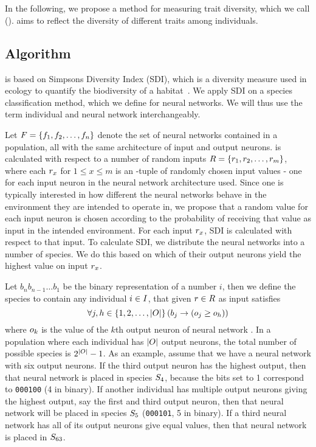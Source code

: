\section{\di{}}\label{sec:nntd}
In the following, we propose a method for measuring trait diversity, which we call \emph{\di{}} (\dia). \dia{} aims to reflect the diversity of different traits among individuals. 

\subsection{Algorithm}
\dia{} is based on Simpsons Diversity Index (SDI), which is a diversity measure used in ecology to quantify the biodiversity of a habitat~\cite{simpson1949measurement}. We apply SDI on a species classification method, which we define for neural networks. We will thus use the term individual and neural network interchangeably.

Let $F = \left\{ f_1, f_2, \dots, f_n \right\}$ denote the set of neural networks contained in a population, all with the same architecture of \nninsetl{} input and \nnoutsetl{} output neurons. \dia{} is calculated with respect to a number of random inputs $R = \left\{ r_1, r_2, \dots, r_m \right\}$, where each $r_x$ for $1 \leq x \leq m$ is an \nninsetl-tuple of randomly chosen input values - one for each input neuron in the neural network architecture used.
Since one is typically interested in how different the neural networks behave in the environment they are intended to operate in, we propose that a random value for each input neuron is chosen according to the probability of receiving that value as input in the intended environment. For each input $r_x$, SDI is calculated with respect to that input.
To calculate SDI, we distribute the neural networks into a number of species.
We do this based on which of their output neurons yield the highest value on input $r_x$. 

Let $b_{n}b_{n-1}\dots b_1$ be the binary representation of a number $i$,
then we define the species  to contain any individual $i \in I$, that given $r \in R$ as input satisfies
%
\[
  \forall j, h \in \left\{ 1, 2, \dots, \lvert O\rvert \right\} \left(b_j \rightarrow \left(o_j \geq o_h\right)\right)
\]
%
where $o_k$ is the value of the $k$th output neuron of neural network \ind.
In a population where each individual has $\lvert O\rvert$ output neurons, the total number of possible species is $2^{\lvert O\rvert} - 1$.  As an example, assume that we have a neural network with six output neurons. If the third output neuron has the highest output, then that neural network is placed in species $S_4$, because the bits set to 1 correspond to \texttt{000100} (4 in binary). If another individual has multiple output neurons giving the highest output, say the first and third output neuron, then that neural network will be placed in species $S_5$ (\texttt{000101}, 5 in binary). If a third neural network has all of its output neurons give equal values, then that neural network is placed in $S_{63}$.

